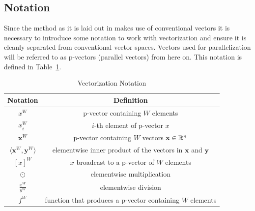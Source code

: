 \documentclass[a4paper, 11pt]{memoir}
\begin{document}
    \subsection{Notation}
    Since the method as it is laid out in \cite{Rhodin:2015} makes use of conventional vectors it is
    necessary to introduce some notation to work with vectorization and ensure it is
    cleanly separated from conventional vector spaces. Vectors used for parallelization
    will be referred to as p-vectors (parallel vectors) from here on. This notation is
    defined in Table~\ref{tab:notation}.
    \begin{table}[b]
        \centering
        \begin{tabular}{|c|c|}
            \hline
            Notation & Definition \\
            \hline
            $x^W$ & p-vector containing $W$ elements\\
            $x^W_i$ & $i$-th element of p-vector $x$\\
            $\mathbf{x}^W$ & p-vector containing $W$ vectors $\mathbf{x} \in \mathbb{R}^n$\\
            $\langle \mathbf{x}^W, \mathbf{y}^W \rangle$ & elementwise inner product of the vectors in $\mathbf{x}$ and $\mathbf{y}$\\
            $[ x ]^W$ & $x$ broadcast to a p-vector of $W$ elements\\
            $\odot$ & elementwise multiplication\\
            $\frac{x^W}{y^W}$ & elementwise division\\
            $f^W$ & function that produces a p-vector containing $W$ elements\\\hline
        \end{tabular}
        \caption{Vectorization Notation}
        \label{tab:notation}
    \end{table}
\end{document}
